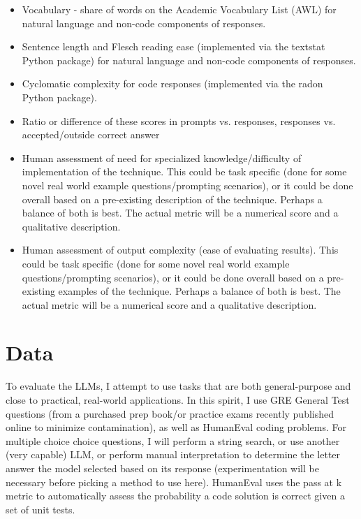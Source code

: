 \documentclass[11pt]{article}
\begin{document}
\begin{itemize}
  \item Vocabulary - share of words on the Academic Vocabulary List (AWL) for natural language and non-code components of responses. \cite{gardner_new_2014}
  \item Sentence length and Flesch reading ease (implemented via the textstat Python package) for natural language and non-code components of responses. \cite{flesch_how_2016, aggarwal_textstat_nodate}
  \item Cyclomatic complexity for code responses (implemented via the radon Python package). \cite{lacchia_radon_nodate}
  \item Ratio or difference of these scores in prompts vs. responses, responses vs. accepted/outside correct answer
  \item Human assessment of need for specialized knowledge/difficulty of implementation of the technique. This could be task specific (done for some novel real world example questions/prompting scenarios), or it could be done overall based on a pre-existing description of the technique. Perhaps a balance of both is best. The actual metric will be a numerical score and a qualitative description.
  \item Human assessment of output complexity (ease of evaluating results). This could be task specific (done for some novel real world example questions/prompting scenarios), or it could be done overall based on a pre-existing examples of the technique. Perhaps a balance of both is best. The actual metric will be a numerical score and a qualitative description.
\end{itemize}

\section*{Data}

To evaluate the LLMs, I attempt to use tasks that are both general-purpose and close to practical, real-world applications. In this spirit, I use GRE General Test questions (from a purchased prep book/or practice exams recently published online to minimize contamination), as well as HumanEval coding problems. For multiple choice choice questions, I will perform a string search, or use another (very capable) LLM, or perform manual interpretation to determine the letter answer the model selected based on its response (experimentation will be necessary before picking a method to use here). HumanEval uses the pass at k metric to automatically assess the probability a code solution is correct given a set of unit tests. \cite{chen_evaluating_2021}
\end{document}

